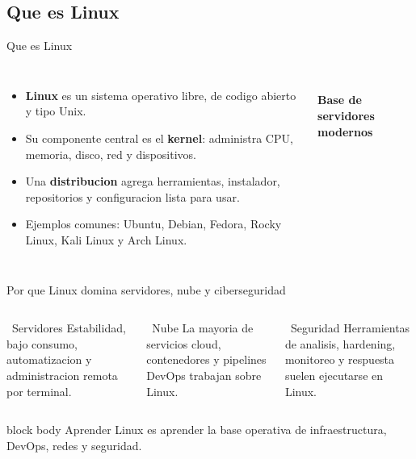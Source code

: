 \documentclass[aspectratio=169]{beamer}
\begin{document}
\subsection{Que es Linux}
\begin{frame}{Que es Linux}
  \begin{columns}[c]
    \begin{itemize}
      \item \textbf{Linux} es un sistema operativo libre, de codigo abierto y tipo Unix.
      \item Su componente central es el \textbf{kernel}: administra CPU, memoria, disco, red y dispositivos.
      \item Una \textbf{distribucion} agrega herramientas, instalador, repositorios y configuracion lista para usar.
      \item Ejemplos comunes: Ubuntu, Debian, Fedora, Rocky Linux, Kali Linux y Arch Linux.
    \end{itemize}
    \centering
    {\color{OTIred}\fontsize{58}{64}\selectfont\faLinux}\\[0.35cm]
    {\large\textbf{Base de servidores modernos}}
  \end{columns}
\end{frame}

\begin{frame}{Por que Linux domina servidores, nube y ciberseguridad}
  \begin{columns}[t]
    \begin{block}{\faServer\ Servidores}
      \small
      Estabilidad, bajo consumo, automatizacion y administracion remota por terminal.
    \end{block}
    \begin{exampleblock}{\faCloud\ Nube}
      \small
      La mayoria de servicios cloud, contenedores y pipelines DevOps trabajan sobre Linux.
    \end{exampleblock}
    \begin{alertblock}{\faUserShield\ Seguridad}
      \small
      Herramientas de analisis, hardening, monitoreo y respuesta suelen ejecutarse en Linux.
    \end{alertblock}
  \end{columns}
  \vfill
  \begin{beamercolorbox}[rounded=true, shadow=false, sep=4pt, center]{block body}
    \small Aprender Linux es aprender la base operativa de infraestructura, DevOps, redes y seguridad.
  \end{beamercolorbox}
\end{frame}
\end{document}
